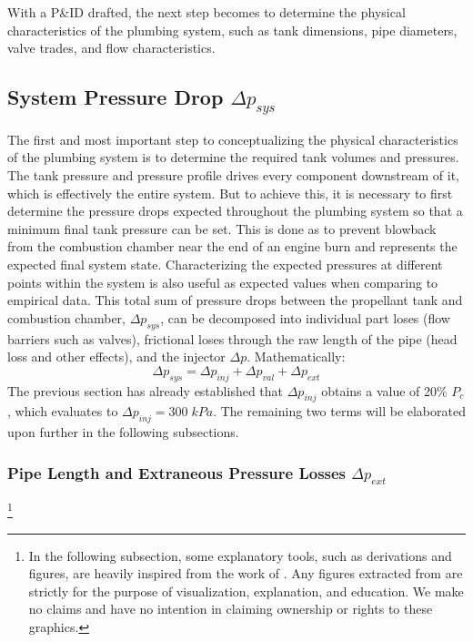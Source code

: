 \documentclass[9pt]{article} %
\numberwithin{equation}{section} %
\begin{document}
With a P\&ID drafted, the next step becomes to determine the physical characteristics of the plumbing system, such as tank dimensions, pipe diameters, valve trades, and flow characteristics.

\subsection{System Pressure Drop $\Delta p_{sys}$}

\hspace{\parindent} The first and most important step to conceptualizing the physical characteristics of the plumbing system is to determine the required tank volumes and pressures. The tank pressure and pressure profile drives every component downstream of it, which is effectively the entire system. But to achieve this, it is necessary to first determine the pressure drops expected throughout the plumbing system so that a minimum final tank pressure can be set. This is done as to prevent blowback from the combustion chamber near the end of an engine burn and represents the expected final system state. Characterizing the expected pressures at different points within the system is also useful as expected values when comparing to empirical data. This total sum of pressure drops between the propellant tank and combustion chamber, $\Delta p_{sys}$, can be decomposed into individual part loses (flow barriers such as valves), frictional loses through the raw length of the pipe (head loss and other effects), and the injector $\Delta p$. Mathematically:
\begin{equation} \label{eq:system_pressure_drop}
\Delta p_{sys} = \Delta p_{inj} + \Delta p_{val} + \Delta p_{ext}
\end{equation}
The previous section has already established that $\Delta p_{inj}$ obtains a value of 20\% $P_{c}$, which evaluates to $\Delta p_{inj} = 300 \; kPa$. The remaining two terms will be elaborated upon further in the following subsections.

\subsubsection{Pipe Length and Extraneous Pressure Losses $\Delta p_{ext}$} \footnote{In the following subsection, some explanatory tools, such as derivations and figures, are heavily inspired from the work of \cite{fluid-mechanics}. Any figures extracted from \cite{fluid-mechanics} are strictly for the purpose of visualization, explanation, and education. We make no claims and have no intention in claiming ownership or rights to these graphics.}
\end{document}
